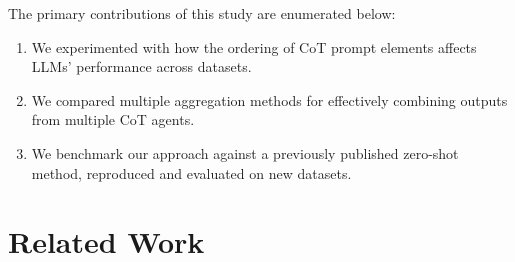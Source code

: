 \documentclass[11pt]{article}
\begin{document}

The primary contributions of this study are enumerated below:
\begin{enumerate}[itemsep=0.2pt]
  \item We experimented with how the ordering of CoT prompt elements affects LLMs' performance across datasets.

\item We compared multiple aggregation methods for effectively combining outputs from multiple CoT agents.

\item We benchmark our approach against a previously published zero-shot method, reproduced and evaluated on new datasets.


\end{enumerate}

\section{Related Work}
\label{sec:RW}


\end{document}
